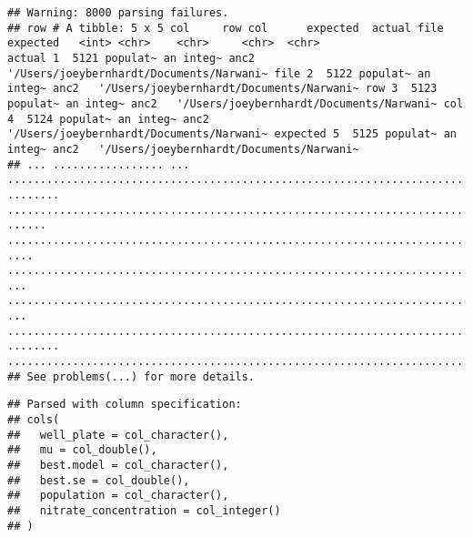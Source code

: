 \documentclass[]{article}
\newenvironment{Shaded}{\begin{snugshade}}{\end{snugshade}}
\newcommand{\KeywordTok}[1]{\textcolor[rgb]{0.13,0.29,0.53}{\textbf{{#1}}}}
\newcommand{\DataTypeTok}[1]{\textcolor[rgb]{0.13,0.29,0.53}{{#1}}}
\newcommand{\StringTok}[1]{\textcolor[rgb]{0.31,0.60,0.02}{{#1}}}
\newcommand{\NormalTok}[1]{{#1}}
\begin{document}
\begin{verbatim}
## Warning: 8000 parsing failures.
## row # A tibble: 5 x 5 col     row col      expected  actual file                                     expected   <int> <chr>    <chr>     <chr>  <chr>                                    actual 1  5121 populat~ an integ~ anc2   '/Users/joeybernhardt/Documents/Narwani~ file 2  5122 populat~ an integ~ anc2   '/Users/joeybernhardt/Documents/Narwani~ row 3  5123 populat~ an integ~ anc2   '/Users/joeybernhardt/Documents/Narwani~ col 4  5124 populat~ an integ~ anc2   '/Users/joeybernhardt/Documents/Narwani~ expected 5  5125 populat~ an integ~ anc2   '/Users/joeybernhardt/Documents/Narwani~
## ... ................. ... .......................................................................... ........ .......................................................................... ...... .......................................................................... .... .......................................................................... ... .......................................................................... ... .......................................................................... ........ ..........................................................................
## See problems(...) for more details.
\end{verbatim}

\begin{Shaded}
\end{Shaded}

\begin{verbatim}
## Parsed with column specification:
## cols(
##   well_plate = col_character(),
##   mu = col_double(),
##   best.model = col_character(),
##   best.se = col_double(),
##   population = col_character(),
##   nitrate_concentration = col_integer()
## )
\end{verbatim}
\end{document}
